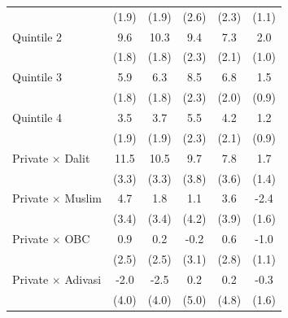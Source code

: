 {\begin{tabular}{l*{5}{c}}
            &       (1.9)         &       (1.9)         &       (2.6)         &       (2.3)         &       (1.1)         \\
\addlinespace
Quintile 2  &         9.6\sym{***}&        10.3\sym{***}&         9.4\sym{***}&         7.3\sym{***}&         2.0\sym{**} \\
            &       (1.8)         &       (1.8)         &       (2.3)         &       (2.1)         &       (1.0)         \\
\addlinespace
Quintile 3  &         5.9\sym{***}&         6.3\sym{***}&         8.5\sym{***}&         6.8\sym{***}&         1.5\sym{*}  \\
            &       (1.8)         &       (1.8)         &       (2.3)         &       (2.0)         &       (0.9)         \\
\addlinespace
Quintile 4  &         3.5\sym{*}  &         3.7\sym{**} &         5.5\sym{**} &         4.2\sym{**} &         1.2         \\
            &       (1.9)         &       (1.9)         &       (2.3)         &       (2.1)         &       (0.9)         \\
\addlinespace
Private $\times$ Dalit&        11.5\sym{***}&        10.5\sym{***}&         9.7\sym{**} &         7.8\sym{**} &         1.7         \\
            &       (3.3)         &       (3.3)         &       (3.8)         &       (3.6)         &       (1.4)         \\
\addlinespace
Private $\times$ Muslim&         4.7         &         1.8         &         1.1         &         3.6         &        -2.4         \\
            &       (3.4)         &       (3.4)         &       (4.2)         &       (3.9)         &       (1.6)         \\
\addlinespace
Private $\times$ OBC&         0.9         &         0.2         &        -0.2         &         0.6         &        -1.0         \\
            &       (2.5)         &       (2.5)         &       (3.1)         &       (2.8)         &       (1.1)         \\
\addlinespace
Private $\times$ Adivasi&        -2.0         &        -2.5         &         0.2         &         0.2         &        -0.3         \\
            &       (4.0)         &       (4.0)         &       (5.0)         &       (4.8)         &       (1.6)         \\

\end{tabular}}
